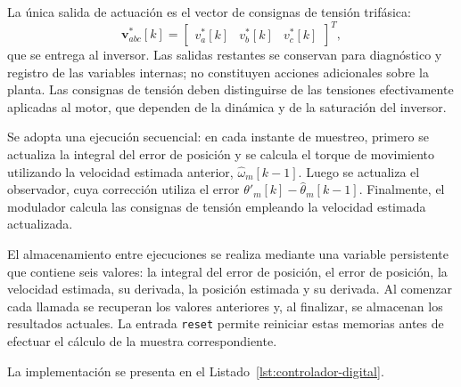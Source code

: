 \documentclass[blue,fullpaper]{ludusofficial}  %
\begin{document}
La única salida de actuación es el vector de consignas de tensión trifásica:
\begin{equation}
    \mathbf{v}_{abc}^{*}[k]
    =
    \begin{bmatrix}
        v_a^{*}[k] &
        v_b^{*}[k] &
        v_c^{*}[k]
    \end{bmatrix}^{T},
\end{equation}
que se entrega al inversor. Las salidas restantes se conservan para diagnóstico y registro de las variables internas; no constituyen acciones adicionales sobre la planta. Las consignas de tensión deben distinguirse de las tensiones efectivamente aplicadas al motor, que dependen de la dinámica y de la saturación del inversor.

Se adopta una ejecución secuencial: en cada instante de muestreo, primero se actualiza la integral del error de posición y se calcula el torque de movimiento utilizando la velocidad estimada anterior, $\hat{\omega}_m[k-1]$. Luego se actualiza el observador, cuya corrección utiliza el error $\theta'_m[k]-\hat{\theta}_m[k-1]$. Finalmente, el modulador calcula las consignas de tensión empleando la velocidad estimada actualizada.


El almacenamiento entre ejecuciones se realiza mediante una variable persistente que contiene seis valores: la integral del error de posición, el error de posición, la velocidad estimada, su derivada, la posición estimada y su derivada. Al comenzar cada llamada se recuperan los valores anteriores y, al finalizar, se almacenan los resultados actuales. La entrada \texttt{reset} permite reiniciar estas memorias antes de efectuar el cálculo de la muestra correspondiente.

La implementación se presenta en el Listado~\ref{lst:controlador-digital}.
\end{document}
